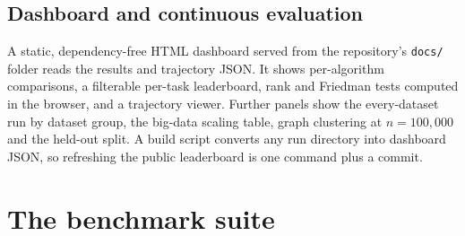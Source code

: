 \documentclass[11pt,a4paper]{article}
\newcommand{\code}[1]{\texttt{#1}}
\begin{document}
\subsection{Dashboard and continuous evaluation}
A static, dependency-free HTML dashboard served from the repository's
\code{docs/} folder reads the results and trajectory JSON. It shows
per-algorithm comparisons, a filterable per-task leaderboard, rank and
Friedman tests computed in the browser, and a trajectory viewer. Further
panels show the every-dataset run by dataset group, the big-data scaling
table, graph clustering at $n = 100{,}000$ and the held-out split. A build
script converts any run directory into dashboard JSON, so refreshing the
public leaderboard is one command plus a commit.

\section{The benchmark suite}\label{sec:suite}
\end{document}
